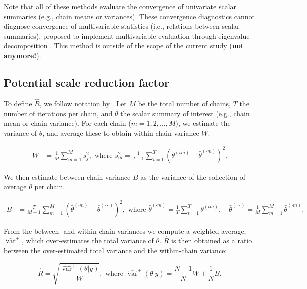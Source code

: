 \documentclass[Royal,times,sageh]{sagej}
\begin{document}
Note that all of these methods evaluate the convergence of univariate
scalar summaries (e.g., chain means or variances). These convergence
diagnostics cannot diagnose convergence of multivariable statistics
(i.e., relations between scalar summaries). \citet{buur18} proposed to
implement multivariable evaluation through eigenvalue decomposition
\citep{mack03}. This method is outside of the scope of the current study
(\textbf{not anymore!}).

\hypertarget{potential-scale-reduction-factor}{%
\subsection{Potential scale reduction
factor}\label{potential-scale-reduction-factor}}

To define \(\widehat{R}\), we follow notation by \citep[p.~5]{veht19}.
Let \(M\) be the total number of chains, \(T\) the number of iterations
per chain, and \(\theta\) the scalar summary of interest (e.g., chain
mean or chain variance). For each chain (\(m = 1, 2, \dots, M\)), we
estimate the variance of \(\theta\), and average these to obtain
within-chain variance \(W\).

\begin{align*}
W&=\frac{1}{M} \sum_{m=1}^{M} s_{j}^{2},  \text { where } s_{m}^{2}=\frac{1}{T-1} \sum_{t=1}^{T}\left(\theta^{(t m)}-\bar{\theta}^{(\cdot m)}\right)^{2}. 
\end{align*}

We then estimate between-chain variance \(B\) as the variance of the
collection of average \(\theta\) per chain.

\begin{align*}
B&=\frac{T}{M-1} \sum_{m=1}^{M}\left(\bar{\theta}^{(\cdot m)}-\bar{\theta}^{(\cdot \cdot)}\right)^{2}, \text { where } \bar{\theta}^{(\cdot m)}=\frac{1}{T} \sum_{t=1}^{T} \theta^{(t m)}, \quad \bar{\theta}^{(\cdot \cdot)}=\frac{1}{M} \sum_{m=1}^{M} \bar{\theta}^{(\cdot m)}. 
\end{align*}

From the between- and within-chain variances we compute a weighted
average, \(\widehat{\operatorname{var}}^{+}\), which over-estimates the
total variance of \(\theta\). \(\widehat{R}\) is then obtained as a
ratio between the over-estimated total variance and the within-chain
variance:

\begin{equation*}
\widehat{R}=\sqrt{\frac{\widehat{\operatorname{var}}^{+}(\theta | y)}{W}},
\text{ where } \widehat{\operatorname{var}}^{+}(\theta | y)=\frac{N-1}{N} W+\frac{1}{N} B.
\end{equation*}
\end{document}
